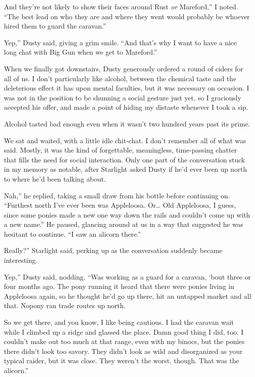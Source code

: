 \leavevmode{}And they’re not likely to show their faces around Rust \textit{or} Mareford,” I noted. “The best lead on who they are and where they went would probably be whoever hired them to guard the caravan.”

\leavevmode{}Yep,” Dusty said, giving a grim smile. “And that’s why I want to have a nice long chat with Big Gun when we get to Mareford.”

When we finally got downstairs, Dusty generously ordered a round of ciders for all of us. I don’t particularly like alcohol, between the chemical taste and the deleterious effect it has upon mental faculties, but it was necessary on occasion. I was not in the position to be shunning a social gesture just yet, so I graciously accepted his offer, and made a point of hiding my distaste whenever I took a sip.

Alcohol tasted bad enough even when it wasn’t two hundred years past its prime.

We sat and waited, with a little idle chit-chat. I don’t remember all of what was said. Mostly, it was the kind of forgettable, meaningless, time-passing chatter that fills the need for social interaction. Only one part of the conversation stuck in my memory as notable, after Starlight asked Dusty if he’d ever been up north to where he’d been talking about.

\leavevmode{}Nah,” he replied, taking a small draw from his bottle before continuing on. “Furthest north I’ve ever been was Appleloosa. Or… Old Appleloosa, I guess, since some ponies made a new one way down the rails and couldn’t come up with a new name.” He paused, glancing around at us in a way that suggested he was hesitant to continue. “I saw an alicorn there.”

\leavevmode{}Really?” Starlight said, perking up as the conversation suddenly became interesting.

\leavevmode{}Yep,” Dusty said, nodding. “Was working as a guard for a caravan, ‘bout three or four months ago. The pony running it heard that there were ponies living in Appleloosa again, so he thought he’d go up there, hit an untapped market and all that. Nopony ran trade routes up north.

\leavevmode{}So we get there, and you know, I like being cautious. I had the caravan wait while I climbed up a ridge and glassed the place. Damn good thing I did, too. I couldn’t make out too much at that range, even with my binocs, but the ponies there didn’t look too savory. They didn’t look as wild and disorganized as your typical raider, but it was close. They weren’t the worst, though. That was the alicorn.”

